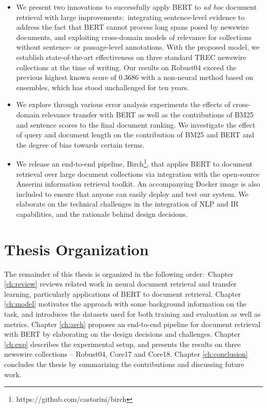 \begin{itemize}
\item
We present two innovations to successfully apply BERT to \textit{ad hoc} document retrieval with large improvements:\
integrating sentence-level evidence to address the fact that BERT cannot process long spans posed by newswire documents, and exploiting cross-domain models of relevance for collections without sentence- or passage-level annotations.
With the proposed model, we establish state-of-the-art effectiveness on three standard TREC newswire collections at the time of writing.
Our results on Robust04 exceed the previous highest known score of 0.3686 \cite{Cormack:2009:RRF:1571941.1572114} with a non-neural method based on ensembles, which has stood unchallenged for ten years.
\item
We explore through various error analysis experiments the effects of cross-domain relevance transfer with BERT as well as the contributions of BM25 and sentence scores to the final document ranking.
We investigate the effect of query and document length on the contribution of BM25 and BERT and the degree of bias towards certain terms.
\myworries{Revisit after completing experimental results}
\item
We release an end-to-end pipeline, Birch\footnote{https://github.com/castorini/birch}, that applies BERT to document retrieval over large document collections via integration with the open-source Anserini information retrieval toolkit.
An accompanying Docker image is also included to ensure that anyone can easily deploy and test our system.
We elaborate on the technical challenges in the integration of NLP and IR capabilities, and the rationale behind design decisions.
\end{itemize}

\section{Thesis Organization}

The remainder of this thesis is organized in the following order:\
Chapter \ref{ch:review} reviews related work in neural document retrieval and transfer learning, particularly applications of BERT to document retrieval.
Chapter \ref{ch:model} motivates the approach with some background information on the task, and introduces the datasets used for both training and evaluation as well as metrics.
Chapter \ref{ch:arch} proposes an end-to-end pipeline for document retrieval with BERT by elaborating on the design decisions and challenges.
Chapter \ref{ch:exp} describes the experimental setup, and presents the results on three newswire collections -- Robust04, Core17 and Core18.
Chapter \ref{ch:conclusion} concludes the thesis by summarizing the contributions and discussing future work.